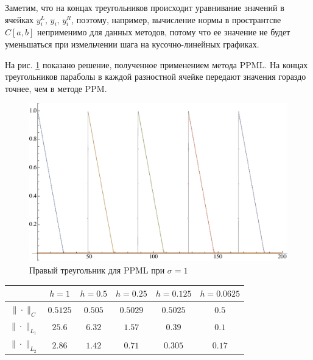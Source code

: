 \documentclass[12pt,a4paper]{article}
\newcommand{\picref}[1]{рис. \ref{#1}}
\begin{document}
    Заметим, что на концах треугольников происходит уравнивание значений в ячейках $ y_i^L,\, y_i,\, y_i^R $, поэтому, например, вычисление нормы в пространтсве $C[a,b]$ неприменимо для данных методов, потому что ее значение не будет уменьшаться при измельчении шага на кусочно-линейных графиках.

    \pagebreak

    На \picref{fig:ppml_rightTriangle_1} показано решение, полученное применением метода PPML. На концах треугольников параболы в каждой разностной ячейке передают значения гораздо точнее, чем в методе PPM.

    \begin{figure}[h]
        \centering
        \includegraphics[width=\textwidth]{sigma=1./advectionPPML_rightTriangle.pdf}
        \caption{Правый треугольник для PPML при $ \sigma = 1 $}
        \label{fig:ppml_rightTriangle_1}
    \end{figure}

    \begin{center}
        \begin{tabular}{ |c|c|c|c|c|c| } 
         \hline
        & $ h=1 $ &  $ h=0.5$ &  $ h=0.25 $ &  $ h=0.125 $ &  $ h=0.0625 $ \\ 
         \hline 
         $\| \cdot \|_{C}$ & $0.5125$ & $0.505$ & $0.5029$ & $0.5025$ & $0.5$
         \\
         \hline
         $\| \cdot \|_{L_1}$ & $25.6$ & $6.32$ & $1.57$ & $0.39$ & $0.1$
         \\
         \hline
         $\| \cdot \|_{L_2}$ & $2.86$ & $1.42$ & $0.71$ & $0.305$ & $0.17$
         \\
         \hline
        \end{tabular}
    \end{center}
\end{document}
